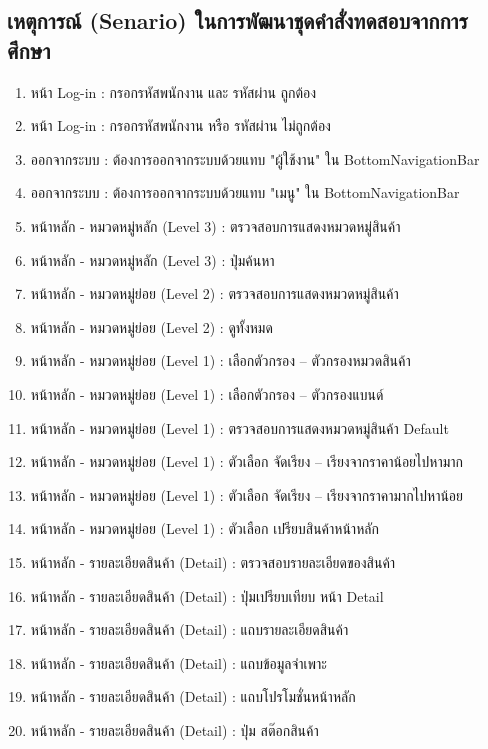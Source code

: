\subsection{เหตุการณ์ (Senario) ในการพัฒนาชุดคำสั่งทดสอบจากการศึกษา} 
    \begin{enumerate}
        \item หน้า Log-in : กรอกรหัสพนักงาน และ รหัสผ่าน ถูกต้อง
        \item หน้า Log-in : กรอกรหัสพนักงาน หรือ รหัสผ่าน ไม่ถูกต้อง
        \item ออกจากระบบ : ต้องการออกจากระบบด้วยแทบ "ผู้ใช้งาน" ใน BottomNavigationBar
        \item ออกจากระบบ : ต้องการออกจากระบบด้วยแทบ "เมนู" ใน BottomNavigationBar
        \item หน้าหลัก - หมวดหมู่หลัก (Level 3) : ตรวจสอบการแสดงหมวดหมู่สินค้า
        \item หน้าหลัก - หมวดหมู่หลัก (Level 3) : ปุ่มค้นหา
        \item หน้าหลัก - หมวดหมู่ย่อย (Level 2) : ตรวจสอบการแสดงหมวดหมู่สินค้า
        \item หน้าหลัก - หมวดหมู่ย่อย (Level 2) : ดูทั้งหมด
        \item หน้าหลัก - หมวดหมู่ย่อย (Level 1) : เลือกตัวกรอง – ตัวกรองหมวดสินค้า
        \item หน้าหลัก - หมวดหมู่ย่อย (Level 1) : เลือกตัวกรอง – ตัวกรองแบนด์
        \item หน้าหลัก - หมวดหมู่ย่อย (Level 1) : ตรวจสอบการแสดงหมวดหมู่สินค้า Default
        \item หน้าหลัก - หมวดหมู่ย่อย (Level 1) : ตัวเลือก จัดเรียง – เรียงจากราคาน้อยไปหามาก
        \item หน้าหลัก - หมวดหมู่ย่อย (Level 1) : ตัวเลือก จัดเรียง – เรียงจากราคามากไปหาน้อย
        \item หน้าหลัก - หมวดหมู่ย่อย (Level 1) : ตัวเลือก เปรียบสินค้าหน้าหลัก
        \item หน้าหลัก - รายละเอียดสินค้า (Detail) : ตรวจสอบรายละเอียดของสินค้า 
        \item หน้าหลัก - รายละเอียดสินค้า (Detail) : ปุ่มเปรียบเทียบ หน้า Detail
        \item หน้าหลัก - รายละเอียดสินค้า (Detail) : แถบรายละเอียดสินค้า
        \item หน้าหลัก - รายละเอียดสินค้า (Detail) : แถบข้อมูลจำเพาะ
        \item หน้าหลัก - รายละเอียดสินค้า (Detail) : แถบโปรโมชั่นหน้าหลัก
        \item หน้าหลัก - รายละเอียดสินค้า (Detail) : ปุ่ม สต๊อกสินค้า

\end{enumerate}
